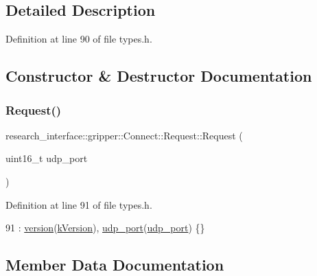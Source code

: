 \subsection{Detailed Description}


Definition at line 90 of file types.\+h.



\subsection{Constructor \& Destructor Documentation}
\mbox{\label{structresearch__interface_1_1gripper_1_1Connect_1_1Request_a219484f2951e25447f666e97e5b091c8}} 
\subsubsection{\texorpdfstring{Request()}{Request()}}
{\footnotesize\ttfamily research\+\_\+interface\+::gripper\+::\+Connect\+::\+Request\+::\+Request (\begin{DoxyParamCaption}\item[{uint16\+\_\+t}]{udp\+\_\+port }\end{DoxyParamCaption})\hspace{0.3cm}{\ttfamily [inline]}}



Definition at line 91 of file types.\+h.


\begin{DoxyCode}
91 : \hyperlink{structresearch__interface_1_1gripper_1_1Connect_1_1Request_a6caad7ccadefdc3068368e1e466a86c7}{version}(\hyperlink{namespaceresearch__interface_1_1gripper_a9f7080493bb2d8257d1d88e302739c46}{kVersion}), \hyperlink{structresearch__interface_1_1gripper_1_1Connect_1_1Request_ad1a7eba96bd79414bb2aef4c202116fc}{udp\_port}(\hyperlink{structresearch__interface_1_1gripper_1_1Connect_1_1Request_ad1a7eba96bd79414bb2aef4c202116fc}{udp\_port}) \{\}
\end{DoxyCode}


\subsection{Member Data Documentation}
\mbox{\label{structresearch__interface_1_1gripper_1_1Connect_1_1Request_ad1a7eba96bd79414bb2aef4c202116fc}} 
